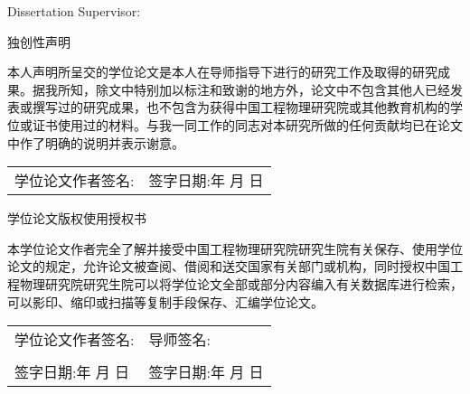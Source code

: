 \vspace{50pt}

\begin{center}
  Dissertation Supervisor: \printsupervisoren \printsecondsupervisoren
\end{center}

\vspace{20pt}

\begin{center}
  \textbf{\thethesismonthen}
\end{center}

\clearpage
\vspace{20pt}
\begin{center}
  独创性声明
\end{center}
\vspace{40pt}
\par 本人声明所呈交的学位论文是本人在导师指导下进行的研究工作及取得的研究成果。据我所知，除文中特别加以标注和致谢的地方外，论文中不包含其他人已经发表或撰写过的研究成果，也不包含为获得中国工程物理研究院或其他教育机构的学位或证书使用过的材料。与我一同工作的同志对本研究所做的任何贡献均已在论文中作了明确的说明并表示谢意。

\vspace{30pt}

\noindent \begin{tabular}{@{}p{}p{}}
  学位论文作者签名: & 签字日期:\qquad \quad 年 \quad 月 \quad 日
\end{tabular}

\vspace{80pt}
\begin{center}
  学位论文版权使用授权书
\end{center}

\vspace{30pt}
\par 本学位论文作者完全了解并接受中国工程物理研究院研究生院有关保存、使用学位论文的规定，允许论文被查阅、借阅和送交国家有关部门或机构，同时授权中国工程物理研究院研究生院可以将学位论文全部或部分内容编入有关数据库进行检索，可以影印、缩印或扫描等复制手段保存、汇编学位论文。

\vspace{40pt}
\begin{flushleft}
\begin{tabular}{@{}p{}p{}}
学位论文作者签名:                          & 导师签名:                                  \\
  \\
签字日期:\qquad \quad 年 \quad 月 \quad 日 & 签字日期:\qquad \quad 年 \quad 月 \quad 日
\end{tabular}
\end{flushleft}


\clearpage

\pagestyle{fancy}